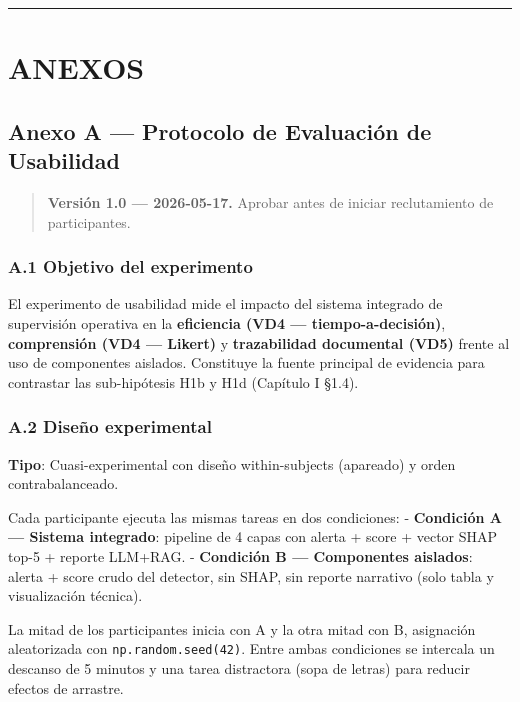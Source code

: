 \begin{center}\rule{0.5\linewidth}{0.5pt}\end{center}

\section{ANEXOS}\label{anexos-1}

\subsection{Anexo A --- Protocolo de Evaluación de
Usabilidad}\label{anexo-a-protocolo-de-evaluaciuxf3n-de-usabilidad}

\begin{quote}
\textbf{Versión 1.0 --- 2026-05-17.} Aprobar antes de iniciar
reclutamiento de participantes.
\end{quote}

\subsubsection{A.1 Objetivo del
experimento}\label{a.1-objetivo-del-experimento}

El experimento de usabilidad mide el impacto del sistema integrado de
supervisión operativa en la \textbf{eficiencia (VD4 ---
tiempo-a-decisión)}, \textbf{comprensión (VD4 --- Likert)} y
\textbf{trazabilidad documental (VD5)} frente al uso de componentes
aislados. Constituye la fuente principal de evidencia para contrastar
las sub-hipótesis H1b y H1d (Capítulo I §1.4).

\subsubsection{A.2 Diseño
experimental}\label{a.2-diseuxf1o-experimental}

\textbf{Tipo}: Cuasi-experimental con diseño within-subjects (apareado)
y orden contrabalanceado.

Cada participante ejecuta las mismas tareas en dos condiciones: -
\textbf{Condición A --- Sistema integrado}: pipeline de 4 capas con
alerta + score + vector SHAP top-5 + reporte LLM+RAG. -
\textbf{Condición B --- Componentes aislados}: alerta + score crudo del
detector, sin SHAP, sin reporte narrativo (solo tabla y visualización
técnica).

La mitad de los participantes inicia con A y la otra mitad con B,
asignación aleatorizada con \texttt{np.random.seed(42)}. Entre ambas
condiciones se intercala un descanso de 5 minutos y una tarea
distractora (sopa de letras) para reducir efectos de arrastre.

